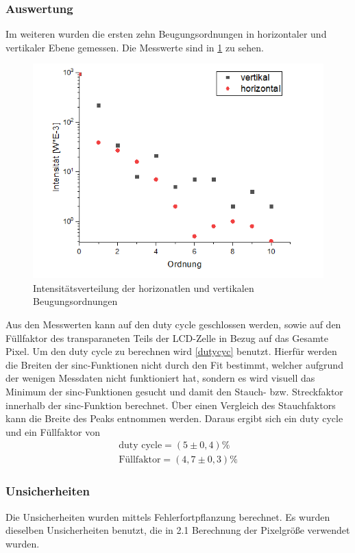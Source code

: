 \subsubsection{Auswertung}
Im weiteren wurden die ersten zehn Beugungsordnungen in horizontaler und vertikaler Ebene gemessen. Die Messwerte sind in \cref{horiz} zu sehen.
\begin{figure}[h!]
	\centering
	\includegraphics[scale = 1]{horizundvertik.png}
	\caption{Intensitätsverteilung der horizonatlen und vertikalen Beugungsordnungen}
	\label{horiz}
\end{figure}
Aus den Messwerten kann auf den duty cycle geschlossen werden, sowie auf den Füllfaktor des transparaneten Teils der LCD-Zelle in Bezug auf das Gesamte Pixel. Um den duty cycle zu berechnen wird \cref{dutycyc} benutzt. Hierfür werden die Breiten der sinc-Funktionen nicht durch den Fit bestimmt, welcher aufgrund der wenigen Messdaten nicht funktioniert hat, sondern es wird visuell das Minimum der sinc-Funktionen gesucht und damit den Stauch- bzw. Streckfaktor innerhalb der sinc-Funktion berechnet. Über einen Vergleich des Stauchfaktors kann die Breite des Peaks entnommen werden.
Daraus ergibt sich ein duty cycle und ein Füllfaktor von 
\begin{align}
	\text{duty cycle} = (5 \pm 0,4)\% \\
	\text{Füllfaktor} = (4,7 \pm 0,3)\%
\end{align}
\subsubsection{Unsicherheiten}
Die Unsicherheiten wurden mittels Fehlerfortpflanzung berechnet. Es wurden dieselben Unsicherheiten benutzt, die in 2.1 Berechnung der Pixelgröße verwendet wurden.
